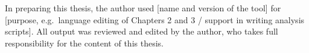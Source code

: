 %

In preparing this thesis, the author used [name and version of the tool] for [purpose, e.g.\ language editing of Chapters 2 and 3 / support in writing analysis scripts]. All output was reviewed and edited by the author, who takes full responsibility for the content of this thesis.
